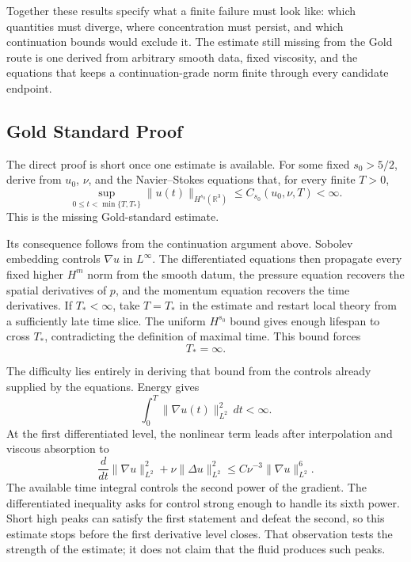 Together these results specify what a finite failure must look like: which quantities must diverge, where concentration must persist, and which continuation bounds would exclude it.
The estimate still missing from the Gold route is one derived from arbitrary smooth data, fixed viscosity, and the equations that keeps a continuation-grade norm finite through every candidate endpoint.

\subsection{Gold Standard Proof}\label{sub:GoldStandardProof}

The direct proof is short once one estimate is available.
For some fixed \(s_0>5/2\), derive from \(u_0\), \(\nu\), and the Navier--Stokes equations that, for every finite \(T>0\),
\[
  \sup_{0\leq t<\min\{T,T_*\}}
  \lVert u(t)\rVert_{H^{s_0}(\mathbb R^3)}
  \leq
  C_{s_0}(u_0,\nu,T)
  <
  \infty.
\]
This is the missing Gold-standard estimate.

Its consequence follows from the continuation argument above.
Sobolev embedding controls \(\nabla u\) in \(L^\infty\).
The differentiated equations then propagate every fixed higher \(H^m\) norm from the smooth datum, the pressure equation recovers the spatial derivatives of \(p\), and the momentum equation recovers the time derivatives.
If \(T_*<\infty\), take \(T=T_*\) in the estimate and restart local theory from a sufficiently late time slice.
The uniform \(H^{s_0}\) bound gives enough lifespan to cross \(T_*\), contradicting the definition of maximal time.
This bound forces
\[
  T_*=\infty.
\]

The difficulty lies entirely in deriving that bound from the controls already supplied by the equations.
Energy gives
\[
  \int_0^T
  \lVert\nabla u(t)\rVert_{L^2}^{2}\,dt
  <
  \infty.
\]
At the first differentiated level, the nonlinear term leads after interpolation and viscous absorption to
\[
  \frac{d}{dt}
  \lVert\nabla u\rVert_{L^2}^{2}
  +
  \nu\lVert\Delta u\rVert_{L^2}^{2}
  \leq
  C\nu^{-3}
  \lVert\nabla u\rVert_{L^2}^{6}.
\]
The available time integral controls the second power of the gradient.
The differentiated inequality asks for control strong enough to handle its sixth power.
Short high peaks can satisfy the first statement and defeat the second, so this estimate stops before the first derivative level closes.
That observation tests the strength of the estimate; it does not claim that the fluid produces such peaks.

